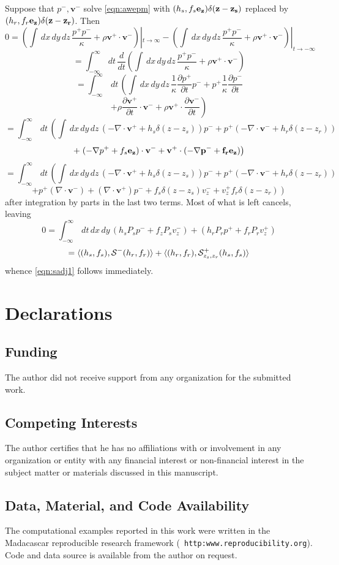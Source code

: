 \documentclass[georeport,12pt]{geophysics}
\newcommand{\bv}{\mathbf{v}}
\begin{document}
Suppose that $p^-,\bv^-$ solve \ref{eqn:awepm}
with $(h_s,f_s\bf{e}_z)\delta(z-z_s)$ replaced by
$ (h_r,f_r\bf{e}_z) \delta(z-z_r)$. Then
\[
0 = 
\left(\int\, dx\,dy\,dz\, \frac{p^+ p^-}{\kappa} +  
\rho \bv^+ \cdot \bv^- \right)|_{t \rightarrow \infty}
-
\left(\int\, dx\,dy\,dz\, \frac{p^+ p^-}{\kappa} +  \rho \bv^+ \cdot \bv^- \right)|_{t \rightarrow -\infty}
\]
\[
= 
\int_{-\infty}^{\infty} \,dt\, \frac{d}{dt}\left(\int\, dx\,dy\,dz\, \frac{p^+ p^-}{\kappa} +  \rho \bv^+ \cdot \bv^- \right)
\]
\[
= 
\int_{-\infty}^{\infty} \,dt\, \left(\int\, dx\,dy\,dz\, \frac{1}{\kappa} \frac{\partial p^+}{\partial t} p^- +  p^+ \frac{1}{\kappa}\frac{\partial p^-}{\partial t} \right.
\]
\[
+
\left. \rho \frac{\partial \bv^+}{\partial t} \cdot \bv^- + \rho \bv^+ \cdot \frac{\partial \bv^-}{\partial t} \right)
\]
\[
= 
\int_{-\infty}^{\infty} \,dt\, \left(\int\, dx\,dy\,dz\, \left(- \nabla \cdot \bv^+ + 
 h_s \delta(z-z_s)\right) p^- + p^+ \left(- \nabla \cdot \bv^- + 
 h_r \delta(z-z_r)\right) \right.
\]
\[
+
\left.  (- \nabla p^++f_s\bf{e}_z) \cdot \bv^- + \bv^+ \cdot (-\nabla
  p^- + f_r \bf{e_z}) \right)
\]
\[
= 
\int_{-\infty}^{\infty}\,dt\, \left(\int\, dx\,dy\,dz\, \left(- \nabla \cdot \bv^+ + 
 h_s \delta(z-z_s)\right) p^- + p^+ \left(- \nabla \cdot \bv^- + 
 h_r \delta(z-z_r)\right) \right.
\]
\[
+
\left.  p^+ (\nabla \cdot \bv^-) + (\nabla \cdot \bv^+) p^- 
  +f_s \delta(z-z_s) v_z^- + v_z^+f_r \delta(z-z_r) \right)
\]
after integration by parts in the last two terms. Most of what is left cancels, leaving 
\[
0 = \int_{-\infty}^{\infty}\,dt\,dx\,dy\, (h_sP_sp^-+f_zP_sv_z^-) +
( h_rP_rp^++f_rP_rv_z^+)
\]
\[
  = \langle (h_s,f_s), {\cal S}^-(h_r,f_r) \rangle+ \langle (h_r,f_r), {\cal S}^+_{z_s,z_r}(h_s,f_s) \rangle
\]
whence \ref{eqn:sadj1} follows immediately.


\section{Declarations}
\subsection{Funding}
The author did not receive support from any organization for the
submitted work.
\subsection{Competing Interests}
The author certifies that he has no affiliations with or involvement
in any organization or entity with any financial interest or
non-financial interest in the subject matter or materials discussed in
this manuscript.
\subsection{Data, Material, and Code Availability}
The computational examples reported in this work were written in the
Madacascar reproducible research framework ({\tt
  http:www.reproducibility.org}). Code and data source is available
from the author on request.




\end{document}
